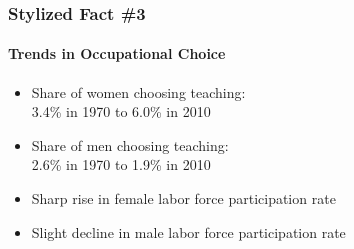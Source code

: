 \documentclass[11pt]{beamer}
\begin{document}
	\begin{frame}
		\frametitle{Stylized Fact \#3}
		\framesubtitle{Trends in Occupational Choice}
		\begin{itemize}
			\item Share of women choosing teaching: \\3.4\% in 1970 to 6.0\% in 2010
			\item Share of men choosing teaching: \\2.6\% in 1970 to 1.9\% in 2010
			\item Sharp rise in female labor force participation rate
			\item Slight decline in male labor force participation rate
		\end{itemize}
	\end{frame}
	
	
\end{document}
